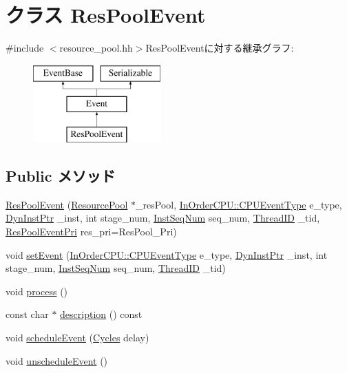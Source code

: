 \hypertarget{classResourcePool_1_1ResPoolEvent}{
\section{クラス ResPoolEvent}
\label{classResourcePool_1_1ResPoolEvent}
}


{\ttfamily \#include $<$resource\_\-pool.hh$>$}ResPoolEventに対する継承グラフ:\begin{figure}[H]
\begin{center}
\leavevmode
\includegraphics[height=3cm]{classResourcePool_1_1ResPoolEvent}
\end{center}
\end{figure}
\subsection*{Public メソッド}
\begin{DoxyCompactItemize}
\item 
\hyperlink{classResourcePool_1_1ResPoolEvent_ade7f67811e3091d431bff925744abfa9}{ResPoolEvent} (\hyperlink{classResourcePool}{ResourcePool} $\ast$\_\-resPool, \hyperlink{classInOrderCPU_aedc081b7a3ef1b1568e62dec4a64c1ca}{InOrderCPU::CPUEventType} e\_\-type, \hyperlink{classRefCountingPtr}{DynInstPtr} \_\-inst, int stage\_\-num, \hyperlink{inst__seq_8hh_a258d93d98edaedee089435c19ea2ea2e}{InstSeqNum} seq\_\-num, \hyperlink{base_2types_8hh_ab39b1a4f9dad884694c7a74ed69e6a6b}{ThreadID} \_\-tid, \hyperlink{classResourcePool_af5077bc20d438add09f07eaf0793f2ac}{ResPoolEventPri} res\_\-pri=ResPool\_\-Pri)
\item 
void \hyperlink{classResourcePool_1_1ResPoolEvent_a36b67a6174c65a497582c7e62161d709}{setEvent} (\hyperlink{classInOrderCPU_aedc081b7a3ef1b1568e62dec4a64c1ca}{InOrderCPU::CPUEventType} e\_\-type, \hyperlink{classRefCountingPtr}{DynInstPtr} \_\-inst, int stage\_\-num, \hyperlink{inst__seq_8hh_a258d93d98edaedee089435c19ea2ea2e}{InstSeqNum} seq\_\-num, \hyperlink{base_2types_8hh_ab39b1a4f9dad884694c7a74ed69e6a6b}{ThreadID} \_\-tid)
\item 
void \hyperlink{classResourcePool_1_1ResPoolEvent_a2e9c5136d19b1a95fc427e0852deab5c}{process} ()
\item 
const char $\ast$ \hyperlink{classResourcePool_1_1ResPoolEvent_a5a14fe478e2393ff51f02e9b7be27e00}{description} () const 
\item 
void \hyperlink{classResourcePool_1_1ResPoolEvent_af53dcbdc9da1cc615d43ff3bd2b4162c}{scheduleEvent} (\hyperlink{classCycles}{Cycles} delay)
\item 
void \hyperlink{classResourcePool_1_1ResPoolEvent_a8521a64adc8d310754330bc7dfe48831}{unscheduleEvent} ()
\end{DoxyCompactItemize}
